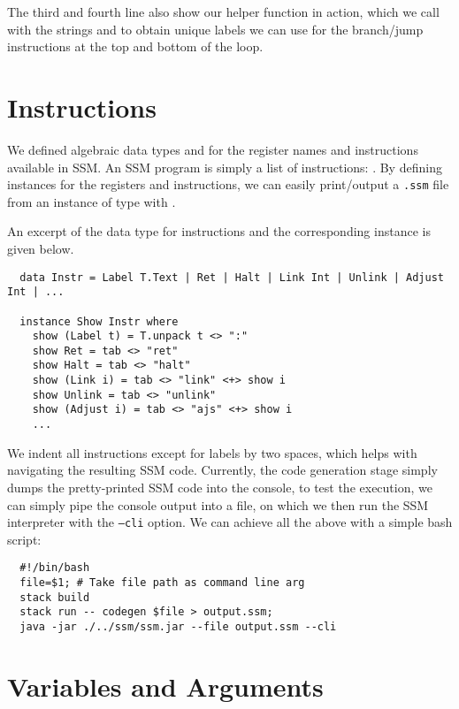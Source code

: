 The third and fourth line also show our  helper function in
action, which we call with the strings  and 
to obtain unique labels we can use for the branch/jump instructions at the
top and bottom of the  loop.



\section{Instructions} \label{sec:codegen-instructions}

We defined algebraic data types  and  for the
register names and instructions available in SSM. An SSM program is simply a
list of instructions: .
By defining  instances for the registers and instructions, we can
easily print/output a \verb|.ssm| file from an instance of type
\haskell{[Instr]} with .

An excerpt of the data type for instructions and the corresponding 
instance is given below.

\begin{verbatim}
  data Instr = Label T.Text | Ret | Halt | Link Int | Unlink | Adjust Int | ...

  instance Show Instr where
    show (Label t) = T.unpack t <> ":"
    show Ret = tab <> "ret"
    show Halt = tab <> "halt"
    show (Link i) = tab <> "link" <+> show i
    show Unlink = tab <> "unlink"
    show (Adjust i) = tab <> "ajs" <+> show i
    ...
\end{verbatim}

We indent all instructions except for labels by two spaces, which helps with
navigating the resulting SSM code.
Currently, the code generation stage simply dumps the pretty-printed SSM
code into the console, to test the execution, we can simply pipe the console
output into a file, on which we then run the SSM interpreter with the
\texttt{--cli} option. We can achieve all the above with a simple bash
script:
%
\begin{verbatim}
  #!/bin/bash
  file=$1; # Take file path as command line arg
  stack build
  stack run -- codegen $file > output.ssm;
  java -jar ./../ssm/ssm.jar --file output.ssm --cli
\end{verbatim}


\section{Variables and Arguments} \label{sec:codegen-vars-args}

